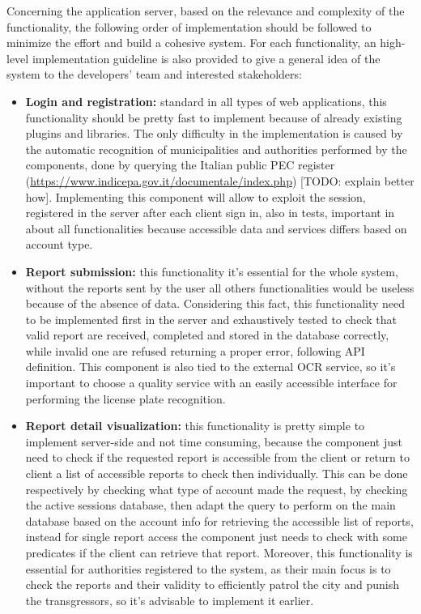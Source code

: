 Concerning the application server, based on the relevance and complexity of the functionality, the following order of implementation should be followed to minimize the effort and build a cohesive system. For each functionality, an high-level implementation guideline is also provided to give a general idea of the system to the developers' team and interested stakeholders:
\begin{itemize}
	\item \textbf{Login and registration:} standard in all types of web applications, this functionality should be pretty fast to implement because of already existing plugins and libraries. The only difficulty in the implementation is caused by the automatic recognition of municipalities and authorities performed by the components, done by querying the Italian public PEC register (\url{https://www.indicepa.gov.it/documentale/index.php}) [TODO: explain better how]. Implementing this component will allow to exploit the session, registered in the server after each client sign in, also in tests, important in about all functionalities because accessible data and services differs based on account type.
	\item \textbf{Report submission:} this functionality it's essential for the whole system, without the reports sent by the user all others functionalities would be useless because of the absence of data. Considering this fact, this functionality need to be implemented first in the server and exhaustively tested to check that valid report are received, completed and stored in the database correctly, while invalid one are refused returning a proper error, following API definition. This component is also tied to the external OCR service, so it's important to choose a quality service with an easily accessible interface for performing the license plate recognition.
	\item \textbf{Report detail visualization:} this functionality is pretty simple to implement server-side and not time consuming, because the component just need to check if the requested report is accessible from the client or return to client a list of accessible reports to check then individually. This can be done respectively by checking what type of account made the request, by checking the active sessions database, then adapt the query to perform on the main database based on the account info for retrieving the accessible list of reports, instead for single report access the component just needs to check with some predicates if the client can retrieve that report. Moreover, this functionality is essential for authorities registered to the system, as their main focus is to check the reports and their validity to efficiently patrol the city and punish the transgressors, so it's advisable to implement it earlier.

\end{itemize}
